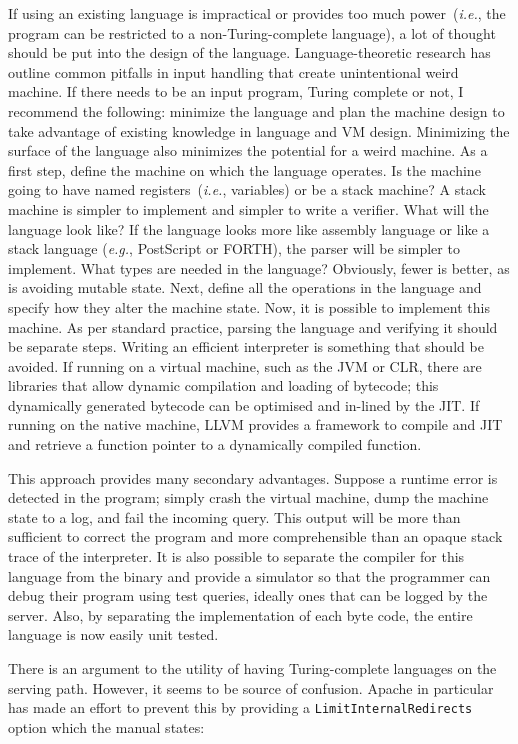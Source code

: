\documentclass[letterpaper,twocolumn,10pt]{article}
\begin{document}
If using an existing language is impractical or provides too much power~(\emph{i.e.}, the program can be restricted to a non-Turing-complete language), a lot of thought should be put into the design of the language. Language-theoretic research has outline common pitfalls in input handling that create unintentional weird machine.\cite{weird} If there needs to be an input program, Turing complete or not, I recommend the following: minimize the language and plan the machine design to take advantage of existing knowledge in language and VM design. Minimizing the surface of the language also minimizes the potential for a weird machine. As a first step, define the machine on which the language operates. Is the machine going to have named registers~(\emph{i.e.}, variables) or be a stack machine? A stack machine is simpler to implement and simpler to write a verifier. What will the language look like? If the language looks more like assembly language or like a stack language (\emph{e.g.}, PostScript or FORTH), the parser will be simpler to implement. What types are needed in the language? Obviously, fewer is better, as is avoiding mutable state. Next, define all the operations in the language and specify how they alter the machine state. Now, it is possible to implement this machine. As per standard practice, parsing the language and verifying it should be separate steps. Writing an efficient interpreter is something that should be avoided. If running on a virtual machine, such as the JVM or CLR, there are libraries that allow dynamic compilation and loading of bytecode; this dynamically generated bytecode can be optimised and in-lined by the JIT. If running on the native machine, LLVM provides a framework to compile and JIT and retrieve a function pointer to a dynamically compiled function.

This approach provides many secondary advantages. Suppose a runtime error is detected in the program; simply crash the virtual machine, dump the machine state to a log, and fail the incoming query. This output will be more than sufficient to correct the program and more comprehensible than an opaque stack trace of the interpreter. It is also possible to separate the compiler for this language from the binary and provide a simulator so that the programmer can debug their program using test queries, ideally ones that can be logged by the server. Also, by separating the implementation of each byte code, the entire language is now easily unit tested.

There is an argument to the utility of having Turing-complete languages on the serving path. However, it seems to be source of confusion. Apache in particular has made an effort to prevent this by providing a \texttt{LimitInternalRedirects} option which the manual states:
\end{document}
